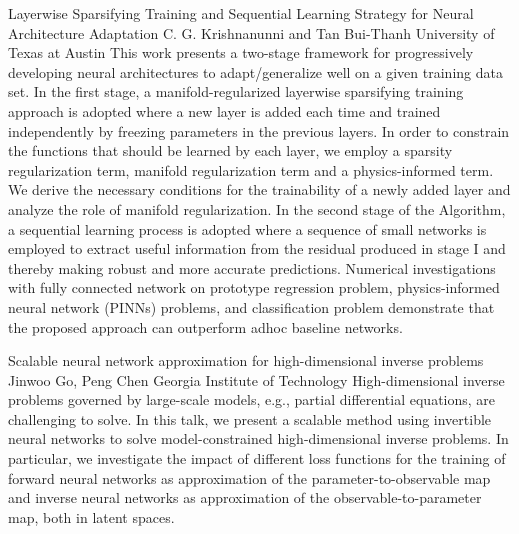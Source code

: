 \vspace{1.5ex}
\abs
{Layerwise Sparsifying Training and Sequential Learning Strategy for Neural Architecture Adaptation}
{C. G. Krishnanunni and Tan Bui-Thanh}
{University of Texas at Austin}
{This work presents a two-stage framework for progressively developing neural architectures to adapt/generalize well on a given training data set.  In the first stage, a manifold-regularized layerwise sparsifying training approach is adopted where a new layer is added each time and trained independently by freezing parameters in the previous layers.  In order to constrain the functions that should be learned by each layer,  we employ a sparsity regularization term, manifold regularization term and a physics-informed term. We derive the necessary conditions for the trainability of a newly added layer and analyze the role of manifold regularization. In the second stage of the Algorithm, a sequential learning process is adopted where a sequence of small networks is employed to extract useful information from the residual produced in stage I and thereby making robust and more accurate predictions. Numerical investigations with fully connected network on prototype regression problem, physics-informed neural network (PINNs) problems, and classification problem demonstrate that the proposed approach can outperform adhoc baseline networks.}


\vspace{1.5ex}
\abs
{Scalable neural network approximation for high-dimensional inverse problems}
{Jinwoo Go, Peng Chen}
{Georgia Institute of Technology}
{High-dimensional inverse problems governed by large-scale models, e.g., partial differential equations, are challenging to solve. In this talk, we present a scalable method using invertible neural networks to solve model-constrained high-dimensional inverse problems. In particular, we investigate the impact of different loss functions for the training of forward neural networks as approximation of the parameter-to-observable map and inverse neural networks as approximation of the observable-to-parameter map, both in latent spaces.}


